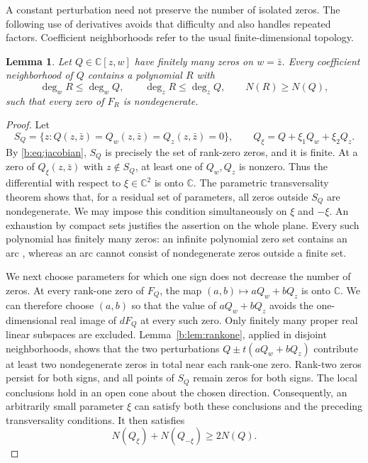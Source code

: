 \documentclass[UTF8,11pt]{ctexart}
\newtheorem{lem}[thm]{Lemma}
\theoremstyle{definition}
\numberwithin{equation}{section}
\newcommand{\C}{\mathbb C}\newcommand{\R}{\mathbb R}
\begin{document}
A constant perturbation need not preserve the number of isolated zeros.
The following use of derivatives avoids that difficulty and also handles
repeated factors. Coefficient neighborhoods refer to the usual
finite-dimensional topology.
\begin{lem}\label{b:lem:regularization}
Let $Q\in\C[z,w]$ have finitely many zeros on $w=\bar z$.
Every coefficient neighborhood of $Q$ contains a polynomial $R$ with
\[
 \deg_wR\le\deg_wQ,\qquad \deg_zR\le\deg_zQ,
 \qquad N(R)\ge N(Q),
\]
such that every zero of $F_R$ is nondegenerate.
\end{lem}
\begin{proof}
Let
\[
 S_Q=\{z:Q(z,\bar z)=Q_w(z,\bar z)=Q_z(z,\bar z)=0\},
 \qquad Q_\xi=Q+\xi_1Q_w+\xi_2Q_z.
\]
By \eqref{b:eq:jacobian}, $S_Q$ is precisely the set of rank-zero
zeros, and it is finite. At a zero of $Q_\xi(z,\bar z)$ with
$z\notin S_Q$, at least one of $Q_w,Q_z$ is nonzero. Thus the
differential with respect to $\xi\in\C^2$ is onto $\C$.
The parametric transversality theorem
\cite[Chapter~3, Section~2]{Hir76} shows that, for a
residual set of parameters, all zeros outside $S_Q$ are nondegenerate.
We may impose this condition simultaneously on $\xi$ and $-\xi$.
An exhaustion by compact sets justifies the assertion on the whole
plane. Every such polynomial has finitely many zeros: an infinite
polynomial zero set contains an arc
\cite[Theorem~2.7, p.~5]{SZ24}, whereas an arc cannot consist of
nondegenerate zeros outside a finite set.

We next choose parameters for which one sign does not decrease the
number of zeros. At every rank-one zero of $F_Q$, the map
$(a,b)\mapsto aQ_w+bQ_z$ is onto $\C$. We can therefore choose
$(a,b)$ so that the value of $aQ_w+bQ_z$ avoids the one-dimensional
real image of $dF_Q$ at every such zero. Only finitely many proper
real linear subspaces are excluded. Lemma~\ref{b:lem:rankone}, applied
in disjoint neighborhoods, shows that the two perturbations
$Q\pm t(aQ_w+bQ_z)$ contribute at least two nondegenerate zeros in
total near each rank-one zero. Rank-two zeros persist for both signs,
and all points of $S_Q$ remain zeros for both signs.
The local conclusions hold in an open cone about the chosen direction.
Consequently, an arbitrarily small parameter $\xi$ can satisfy both
these conclusions and the preceding transversality conditions. It then
satisfies
\begin{equation}\label{b:eq:oppositeperturbations}
 N(Q_\xi)+N(Q_{-\xi})\ge2N(Q).
\end{equation}


\end{proof}
\end{document}
